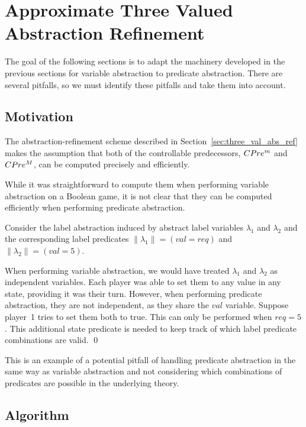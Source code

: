 \section{Approximate Three Valued Abstraction Refinement}
\label{sec:approx_three_val}

The goal of the following sections is to adapt the machinery developed in the previous sections for variable abstraction to predicate abstraction. There are several pitfalls, so we must identify these pitfalls and take them into account.

\subsection{Motivation}
The abstraction-refinement scheme described in Section~\ref{sec:three_val_abs_ref} makes the assumption that both of the controllable predecessors, $CPre^m$ and $CPre^M$, can be computed precisely and efficiently.

While it was straightforward to compute them when performing variable abstraction on a Boolean game, it is not clear that they can be computed efficiently when performing predicate abstraction.

\begin{ex}
    \everymath{\mathtt{\xdef\tmp{\fam\the\fam\relax}\aftergroup\tmp}}
    \everydisplay{\mathtt{\xdef\tmp{\fam\the\fam\relax}\aftergroup\tmp}}
    Consider the label abstraction induced by abstract label variables $\lambda_1$ and $\lambda_2$ and the corresponding label predicates $\|\lambda_1\| = (val=req)$ and $\|\lambda_2\| = (val=5)$.

    When performing variable abstraction, we would have treated $\lambda_1$ and $\lambda_2$ as independent variables. Each player was able to set them to any value in any state, providing it was their turn. However, when performing predicate abstraction, they are not independent, as they share the $val$ variable. Suppose player~1 tries to set them both to true. This can only be performed when $req=5$. This additional state predicate is needed to keep track of which label predicate combinations are valid.
    \qed
\end{ex}

This is an example of a potential pitfall of handling predicate abstraction in the same way as variable abstraction and not considering which combinations of predicates are possible in the underlying theory. 

\subsection{Algorithm}

